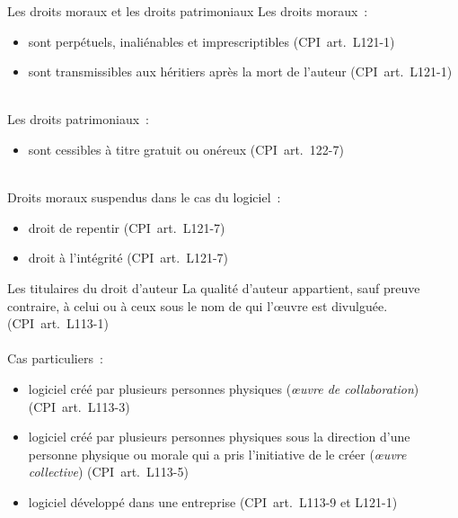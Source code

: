 \documentclass{beamer}
\begin{document}
\begin{frame}{Les droits moraux et les droits patrimoniaux}
    Les droits moraux~:
    \begin{itemize}
        \item sont perpétuels, inaliénables et imprescriptibles (CPI~art.~L121-1)
        \item sont transmissibles aux héritiers après la mort de l'auteur (CPI~art.~L121-1)
    \end{itemize}
    ~\\
    Les droits patrimoniaux~:
    \begin{itemize}
        \item sont cessibles à titre gratuit ou onéreux (CPI~art.~122-7)
    \end{itemize}
    ~\\
    Droits moraux suspendus dans le cas du logiciel~:
    \begin{itemize}
        \item droit de repentir (CPI~art.~L121-7)
        \item droit à l'intégrité (CPI~art.~L121-7)
    \end{itemize}
\end{frame}

\begin{frame}{Les titulaires du droit d’auteur}
    \og{}La qualité d'auteur appartient, sauf preuve contraire, à celui ou
    à ceux sous le nom de qui l'œuvre est divulguée.\fg{} (CPI~art.~L113-1)\\
    ~\\
    Cas particuliers~:
    \begin{itemize}
        \item logiciel créé par plusieurs personnes physiques (\emph{œuvre
              de collaboration}) (CPI~art.~L113-3)
        \item logiciel créé par plusieurs personnes physiques sous la
              direction d'une personne physique ou morale qui a pris
              l'initiative de le créer (\emph{œuvre collective})
              (CPI~art.~L113-5)
        \item logiciel développé dans une entreprise (CPI~art.~L113-9 et
              L121-1)
    \end{itemize}
\end{frame}
\end{document}
